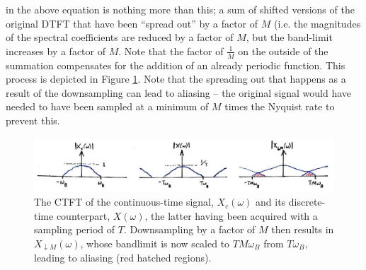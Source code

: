 in the above equation is nothing more than this; a sum of shifted versions of the original
DTFT that have been ``spread out'' by a factor of $M$ (i.e. the magnitudes of the spectral
coefficients are reduced by a factor of $M$, but the band-limit increases by a factor of
$M$. Note that the factor of $\frac{1}{M}$ on the outside of the summation compensates
for the addition of an already periodic function. This process is depicted in Figure
\ref{fig::lecture_14_downsample_alias}.
Note that the spreading out that happens as a result of the downsampling can lead to
aliasing -- the original signal would have needed to have been sampled at a minimum of $M$
times the Nyquist rate to prevent this.
%
\begin{figure}[H]
  \includegraphics[width=\textwidth]{images/lecture_14_downsample_alias.JPG}
  \caption{The CTFT of the continuous-time signal, $X_c(\omega)$ and its
    discrete-time counterpart, $X(\omega)$, the latter having been acquired
    with a sampling period of $T$. Downsampling by a factor of $M$ then results
    in $X_{\downarrow M}(\omega)$, whose bandlimit is now scaled to $TM\omega_B$
    from $T\omega_B$, leading to aliasing (red hatched regions).
  }
  \label{fig::lecture_14_downsample_alias}
\end{figure}
%
